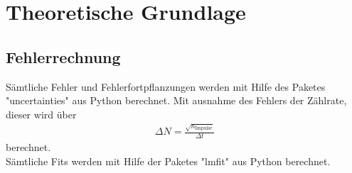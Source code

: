 \section{Theoretische Grundlage}
\label{sec:Theorie}




\subsection{Fehlerrechnung}
Sämtliche Fehler und Fehlerfortpflanzungen werden mit Hilfe des Paketes "uncertainties" \cite{uncertainties} aus Python berechnet. Mit ausnahme des Fehlers der Zählrate, dieser wird über
\begin{align*}
	\Delta N = \frac{\sqrt{n_\text{Impulse}}}{\Delta t}
\end{align*}
berechnet. \\
Sämtliche Fits werden mit Hilfe der Paketes "lmfit" \cite{lmfit} aus Python berechnet.

